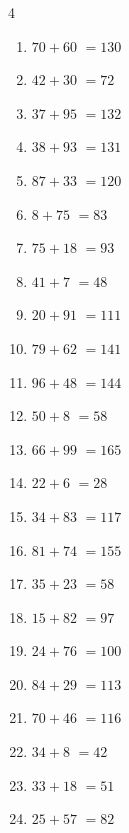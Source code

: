 \begin{multicols}{4}
\begin{enumerate}
  \item $70+60$
        $=130$

  \item $42+30$
        $=72$

  \item $37+95$
        $=132$

  \item $38+93$
        $=131$

  \item $87+33$
        $=120$

  \item $8+75$
        $=83$

  \item $75+18$
        $=93$

  \item $41+7$
        $=48$

  \item $20+91$
        $=111$

  \item $79+62$
        $=141$

  \item $96+48$
        $=144$

  \item $50+8$
        $=58$

  \item $66+99$
        $=165$

  \item $22+6$
        $=28$

  \item $34+83$
        $=117$

  \item $81+74$
        $=155$

  \item $35+23$
        $=58$

  \item $15+82$
        $=97$

  \item $24+76$
        $=100$

  \item $84+29$
        $=113$

  \item $70+46$
        $=116$

  \item $34+8$
        $=42$

  \item $33+18$
        $=51$

  \item $25+57$
        $=82$


\end{enumerate}
\end{multicols}
